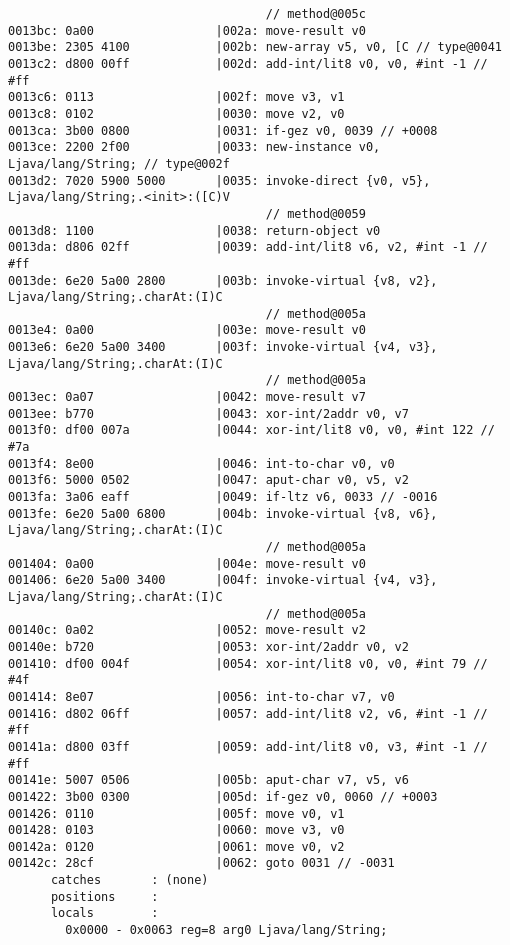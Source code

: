 \begin{lstlisting}
                                    // method@005c
0013bc: 0a00                 |002a: move-result v0
0013be: 2305 4100            |002b: new-array v5, v0, [C // type@0041
0013c2: d800 00ff            |002d: add-int/lit8 v0, v0, #int -1 // #ff
0013c6: 0113                 |002f: move v3, v1
0013c8: 0102                 |0030: move v2, v0
0013ca: 3b00 0800            |0031: if-gez v0, 0039 // +0008
0013ce: 2200 2f00            |0033: new-instance v0, Ljava/lang/String; // type@002f
0013d2: 7020 5900 5000       |0035: invoke-direct {v0, v5}, Ljava/lang/String;.<init>:([C)V
                                    // method@0059
0013d8: 1100                 |0038: return-object v0
0013da: d806 02ff            |0039: add-int/lit8 v6, v2, #int -1 // #ff
0013de: 6e20 5a00 2800       |003b: invoke-virtual {v8, v2}, Ljava/lang/String;.charAt:(I)C
                                    // method@005a
0013e4: 0a00                 |003e: move-result v0
0013e6: 6e20 5a00 3400       |003f: invoke-virtual {v4, v3}, Ljava/lang/String;.charAt:(I)C
                                    // method@005a
0013ec: 0a07                 |0042: move-result v7
0013ee: b770                 |0043: xor-int/2addr v0, v7
0013f0: df00 007a            |0044: xor-int/lit8 v0, v0, #int 122 // #7a
0013f4: 8e00                 |0046: int-to-char v0, v0
0013f6: 5000 0502            |0047: aput-char v0, v5, v2
0013fa: 3a06 eaff            |0049: if-ltz v6, 0033 // -0016
0013fe: 6e20 5a00 6800       |004b: invoke-virtual {v8, v6}, Ljava/lang/String;.charAt:(I)C
                                    // method@005a
001404: 0a00                 |004e: move-result v0
001406: 6e20 5a00 3400       |004f: invoke-virtual {v4, v3}, Ljava/lang/String;.charAt:(I)C
                                    // method@005a
00140c: 0a02                 |0052: move-result v2
00140e: b720                 |0053: xor-int/2addr v0, v2
001410: df00 004f            |0054: xor-int/lit8 v0, v0, #int 79 // #4f
001414: 8e07                 |0056: int-to-char v7, v0
001416: d802 06ff            |0057: add-int/lit8 v2, v6, #int -1 // #ff
00141a: d800 03ff            |0059: add-int/lit8 v0, v3, #int -1 // #ff
00141e: 5007 0506            |005b: aput-char v7, v5, v6
001422: 3b00 0300            |005d: if-gez v0, 0060 // +0003
001426: 0110                 |005f: move v0, v1
001428: 0103                 |0060: move v3, v0
00142a: 0120                 |0061: move v0, v2
00142c: 28cf                 |0062: goto 0031 // -0031
      catches       : (none)
      positions     :
      locals        :
        0x0000 - 0x0063 reg=8 arg0 Ljava/lang/String;


\end{lstlisting}
